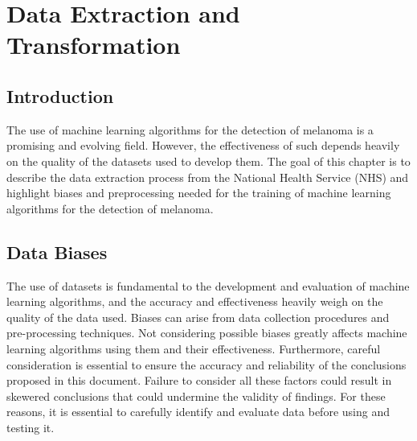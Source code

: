 \chapter{Data Extraction and Transformation}

\section{Introduction}
The use of machine learning algorithms for the detection of melanoma is a promising and evolving field. However, the effectiveness of such depends heavily on the quality of the datasets used to develop them. The goal of this chapter is to describe the data extraction process from the National Health Service (NHS) and highlight biases and preprocessing needed for the training of machine learning algorithms for the detection of melanoma.  

\section{Data Biases}
The use of datasets is fundamental to the development and evaluation of machine learning algorithms, and the accuracy and effectiveness heavily weigh on the quality of the data used. Biases can arise from data collection procedures and pre-processing techniques. Not considering possible biases greatly affects machine learning algorithms using them and their effectiveness. Furthermore, careful consideration is essential to ensure the accuracy and reliability of the conclusions proposed in this document. Failure to consider all these factors could result in skewered conclusions that could undermine the validity of findings. For these reasons, it is essential to carefully identify and evaluate data before using and testing it.


